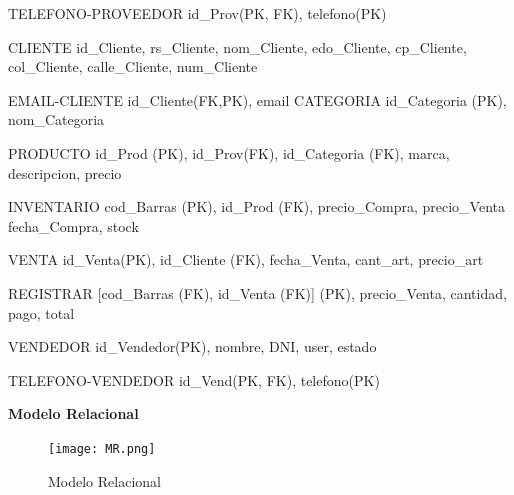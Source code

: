\documentclass[30pt,fleqn]{article}
\begin{document}
 \vspace{10mm} %
 
TELEFONO-PROVEEDOR {id_Prov(PK, FK), telefono(PK) } 

\vspace{10mm} %

CLIENTE{ id_Cliente, rs_Cliente, nom_Cliente, edo_Cliente, cp_Cliente, col_Cliente, calle_Cliente, num_Cliente}

\vspace{10mm} %

EMAIL-CLIENTE {id_Cliente(FK,PK), email} 
CATEGORIA {id_Categoria (PK), nom_Categoria}

\vspace{10mm} %

PRODUCTO {id_Prod (PK), id_Prov(FK), id_Categoria (FK), marca, descripcion, precio}

\vspace{10mm} %

INVENTARIO { cod_Barras (PK), id_Prod (FK), precio_Compra, precio_Venta fecha_Compra, stock} 

\vspace{10mm} %

VENTA {id_Venta(PK), id_Cliente (FK), fecha_Venta, cant_art, precio_art}

\vspace{10mm} %

REGISTRAR {[cod_Barras (FK), id_Venta (FK)] (PK), precio_Venta, cantidad, pago, total}

\vspace{10mm} %

VENDEDOR {id_Vendedor(PK), nombre, DNI, user, estado}

 \vspace{10mm} %
 
TELEFONO-VENDEDOR {id_Vend(PK, FK), telefono(PK) } 

\vspace{10mm} %


\vspace{20mm} %
\item\textbf{Modelo Relacional}

\vspace{10mm} %

\begin{figure}[h]
    \centering
    \texttt{[image: MR.png]}
    \caption{Modelo Relacional}
    \label{fig:Modelo Relacional}
\end{figure}
\end{document}
